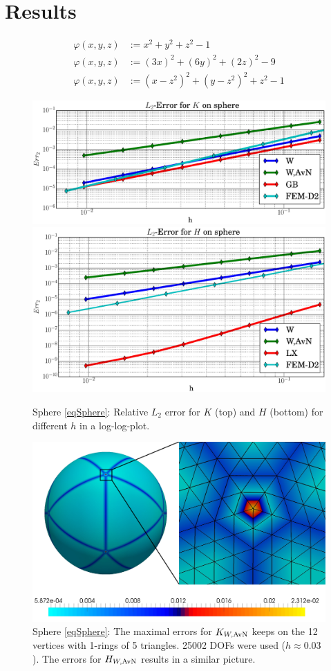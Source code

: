 \section{Results} \label{secResults}
  
  \begin{align}
    \label{eqSphere}
    \varphi\left( x,y,z \right) &:= x^{2} + y^{2} + z^{2} - 1 \\
    \label{eqEllipsoid}
    \varphi\left( x,y,z \right) &:= \left( 3x \right)^{2} + \left( 6y \right)^{2} + \left( 2z \right)^{2} - 9\\
    \label{eqQuartic}
    \varphi\left( x,y,z \right) &:= \left( x - z^{2} \right)^{2} + \left( y - z^{2} \right)^{2} + z^{2} - 1
  \end{align}


  \begin{figure}
    \centering\includegraphics[width=.49\textwidth]{bilder/sphere/L2K.eps}
    \centering\includegraphics[width=.49\textwidth]{bilder/sphere/L2H.eps}
    \caption{Sphere \eqref{eqSphere}: Relative \( L_{2} \) error for \( K \) (top) and
                                                     \( H \) (bottom) for different \( h \) in a log-log-plot.}
    \label{figSphereL2Err}
  \end{figure}

  \begin{figure}
    \centering\includegraphics[width=.49\textwidth]{bilder/sphere/ErrView.jpg}
    \caption{Sphere \eqref{eqSphere}:
                  The maximal errors for \( K_{W,\text{AvN}} \) keeps on the 12 vertices with 1-rings of 5 triangles.
                  25002 DOFs were used (\( h\approx 0.03 \)).
                  The errors for \( H_{W,\text{AvN}} \) results in a similar picture.}
    \label{figSphereErrView}
  \end{figure}

